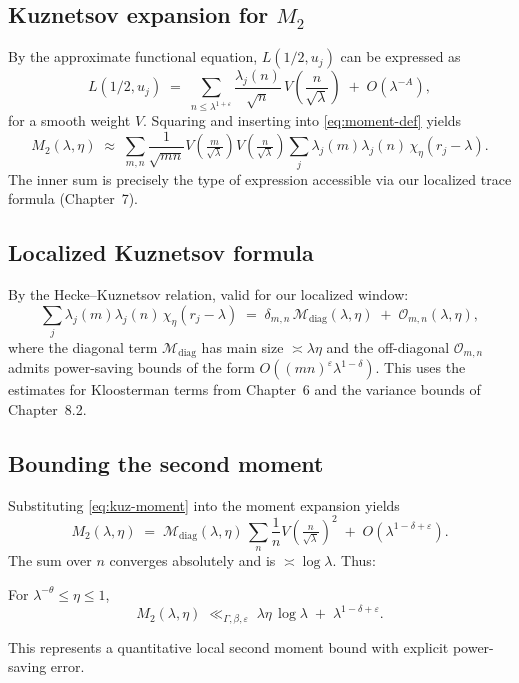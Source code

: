 \subsection{Kuznetsov expansion for $M_2$}
By the approximate functional equation, $L(1/2,u_j)$ can be expressed as
\[
L(1/2,u_j)\;=\;\sum_{n\le \lambda^{1+\varepsilon}} \frac{\lambda_j(n)}{\sqrt{n}}\,V\!\left(\frac{n}{\sqrt{\lambda}}\right)\;+\;O(\lambda^{-A}),
\]
for a smooth weight $V$. Squaring and inserting into \eqref{eq:moment-def} yields
\[
M_2(\lambda,\eta)\;\approx\;\sum_{m,n}\frac{1}{\sqrt{mn}} V\!\left(\tfrac{m}{\sqrt{\lambda}}\right)V\!\left(\tfrac{n}{\sqrt{\lambda}}\right)\sum_j \lambda_j(m)\lambda_j(n)\,\chi_\eta(r_j-\lambda).
\]
The inner sum is precisely the type of expression accessible via our localized trace formula (Chapter~7).

\subsection{Localized Kuznetsov formula}
By the Hecke–Kuznetsov relation, valid for our localized window:
\begin{equation}\label{eq:kuz-moment}
\sum_j \lambda_j(m)\lambda_j(n)\,\chi_\eta(r_j-\lambda)\;=\;\delta_{m,n}\,\mathcal{M}_{\mathrm{diag}}(\lambda,\eta)\;+\;\mathcal{O}_{m,n}(\lambda,\eta),
\end{equation}
where the diagonal term $\mathcal{M}_{\mathrm{diag}}$ has main size $\asymp \lambda\eta$ and the off-diagonal $\mathcal{O}_{m,n}$ admits power-saving bounds of the form $O((mn)^\varepsilon\lambda^{1-\delta})$. This uses the estimates for Kloosterman terms from Chapter~6 and the variance bounds of Chapter~8.2.

\subsection{Bounding the second moment}
Substituting \eqref{eq:kuz-moment} into the moment expansion yields
\[
M_2(\lambda,\eta)\;=\;\mathcal{M}_{\mathrm{diag}}(\lambda,\eta)\,\sum_n \frac{1}{n}V\!\left(\tfrac{n}{\sqrt{\lambda}}\right)^2\;+\;O(\lambda^{1-\delta+\varepsilon}).
\]
The sum over $n$ converges absolutely and is $\asymp\log \lambda$. Thus:
\begin{theorem}\label{thm:secondmoment}
For $\lambda^{-\theta}\le \eta\le 1$,
\[
M_2(\lambda,\eta)\;\ll_{\Gamma,\beta,\varepsilon}\;\lambda\eta\,\log\lambda\;+\;\lambda^{1-\delta+\varepsilon}.
\]
\end{theorem}
This represents a quantitative local second moment bound with explicit power-saving error.

